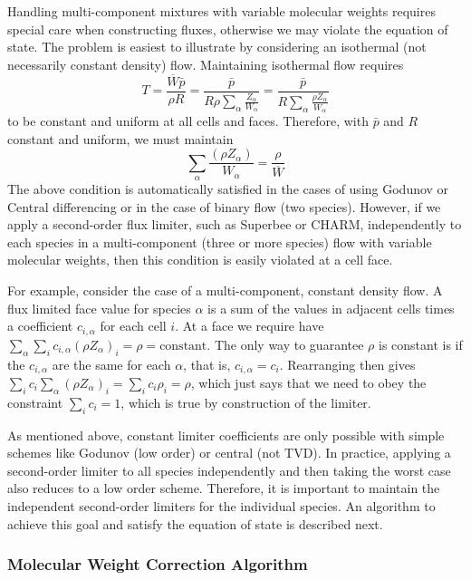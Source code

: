 Handling multi-component mixtures with variable molecular weights requires special care when constructing fluxes, otherwise we may violate the equation of state.  The problem is easiest to illustrate by considering an isothermal (not necessarily constant density) flow.  Maintaining isothermal flow requires
\begin{equation}
T = \frac{\overline{W} \bar{p}}{\rho R} = \frac{\bar{p}}{R \rho \sum_\alpha \frac{Z_\alpha}{W_\alpha}} = \frac{\bar{p}}{R \sum_\alpha \frac{\rho Z_\alpha}{W_\alpha}}
\end{equation}
to be constant and uniform at all cells and faces. Therefore, with $\bar{p}$ and $R$ constant and uniform, we must maintain
\begin{equation}
\label{eq:rho_mw}
\sum_\alpha \frac{(\rho Z_\alpha)}{W_\alpha} = \frac{\rho}{\overline{W}}
\end{equation}
The above condition is automatically satisfied in the cases of using Godunov or Central differencing or in the case of binary flow (two species).  However, if we apply a second-order flux limiter, such as Superbee or CHARM, independently to each species in a multi-component (three or more species) flow with variable molecular weights, then this condition is easily violated at a cell face.

For example, consider the case of a multi-component, constant density flow.  A flux limited face value for species $\alpha$ is a sum of the values in adjacent cells times a coefficient $c_{i,\alpha}$ for each cell $i$.  At a face we require have $\sum_\alpha \sum_i c_{i,\alpha} (\rho Z_\alpha)_i = \rho = \mbox{constant}$.  The only way to guarantee $\rho$ is constant is if the $c_{i,\alpha}$ are the same for each $\alpha$, that is, $c_{i,\alpha} = c_i$.  Rearranging then gives $\sum_i c_i \sum_\alpha (\rho Z_\alpha)_i = \sum_i c_i \rho_i = \rho$, which just says that we need to obey the constraint $\sum_i c_i = 1$, which is true by construction of the limiter.

As mentioned above, constant limiter coefficients are only possible with simple schemes like Godunov (low order) or central (not TVD).  In practice, applying a second-order limiter to all species independently and then taking the worst case also reduces to a low order scheme.  Therefore, it is important to maintain the independent second-order limiters for the individual species.  An algorithm to achieve this goal and satisfy the equation of state is described next.

\subsubsection{Molecular Weight Correction Algorithm}


